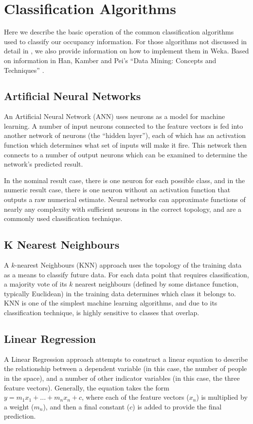 \chapter{Classification Algorithms}
\label{chap:appendix:classification}
Here we describe the basic operation of the common classification algorithms used to classify our occupancy information. For those algorithms not discussed in detail in , we also provide information on how to implement them in Weka. Based on information in Han, Kamber and Pei's ``Data Mining: Concepts and Techniques'' \cite{han2011data}.

\section{Artificial Neural Networks}
An Artificial Neural Network (ANN) uses neurons as a model for machine learning. A number of input neurons connected to the feature vectors is fed into another network of neurons (the ``hidden layer''), each of which has an activation function which determines what set of inputs will make it fire. This network then connects to a number of output neurons which can be examined to determine the network's predicted result.

In the nominal result case, there is one neuron for each possible class, and in the numeric result case, there is one neuron without an activation function that outputs a raw numerical estimate. Neural networks can approximate functions of nearly any complexity with sufficient neurons in the correct topology, and are a commonly used classification technique.

\section{K Nearest Neighbours}
A $k$-nearest Neighbours (KNN) approach uses the topology of the training data as a means to classify future data. For each data point that requires classification, a majority vote of its $k$ nearest neighbours (defined by some distance function, typically Euclidean) in the training data determines which class it belongs to. KNN is one of the simplest machine learning algorithms, and due to its classification technique, is highly sensitive to classes that overlap. 

\section{Linear Regression}
A Linear Regression approach attempts to construct a linear equation to describe the relationship between a dependent variable (in this case, the number of people in the space), and a number of other indicator variables (in this case, the three feature vectors). Generally, the equation takes the form $y = m_1x_1 + ... + m_nx_n + c$, where each of the feature vectors ($x_n$) is multiplied by a weight ($m_n$), and then a final constant ($c$) is added to provide the final prediction.

